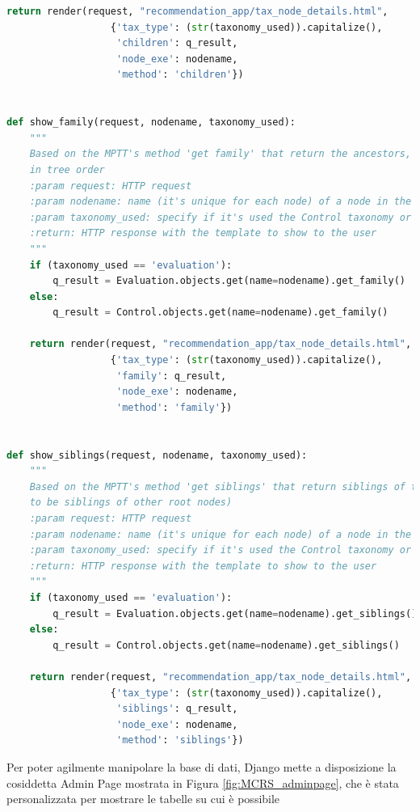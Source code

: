 \begin{lstlisting}[language=Python, caption={Parti principali del codice delle View della soluzione per gestire la navigazione 
    delle tassonomie, quella delle Evaluation e quella dei Controlli}]
    return render(request, "recommendation_app/tax_node_details.html",
                  {'tax_type': (str(taxonomy_used)).capitalize(),
                   'children': q_result,
                   'node_exe': nodename,
                   'method': 'children'})


def show_family(request, nodename, taxonomy_used):
    """
    Based on the MPTT's method 'get family' that return the ancestors, the model instance itself and the descendants,
    in tree order
    :param request: HTTP request
    :param nodename: name (it's unique for each node) of a node in the taxonomy
    :param taxonomy_used: specify if it's used the Control taxonomy or the Evaluation taxonomy
    :return: HTTP response with the template to show to the user
    """
    if (taxonomy_used == 'evaluation'):
        q_result = Evaluation.objects.get(name=nodename).get_family()
    else:
        q_result = Control.objects.get(name=nodename).get_family()

    return render(request, "recommendation_app/tax_node_details.html",
                  {'tax_type': (str(taxonomy_used)).capitalize(),
                   'family': q_result,
                   'node_exe': nodename,
                   'method': 'family'})


def show_siblings(request, nodename, taxonomy_used):
    """
    Based on the MPTT's method 'get siblings' that return siblings of the model instance (root nodes are considered
    to be siblings of other root nodes)
    :param request: HTTP request
    :param nodename: name (it's unique for each node) of a node in the taxonomy
    :param taxonomy_used: specify if it's used the Control taxonomy or the Evaluation taxonomy
    :return: HTTP response with the template to show to the user
    """
    if (taxonomy_used == 'evaluation'):
        q_result = Evaluation.objects.get(name=nodename).get_siblings()
    else:
        q_result = Control.objects.get(name=nodename).get_siblings()

    return render(request, "recommendation_app/tax_node_details.html",
                  {'tax_type': (str(taxonomy_used)).capitalize(),
                   'siblings': q_result,
                   'node_exe': nodename,
                   'method': 'siblings'})
\end{lstlisting}
%
Per poter agilmente manipolare la base di dati, Django mette a disposizione la cosiddetta Admin Page mostrata in 
Figura \ref{fig:MCRS_adminpage}, che è stata personalizzata per mostrare le tabelle su cui è possibile 
